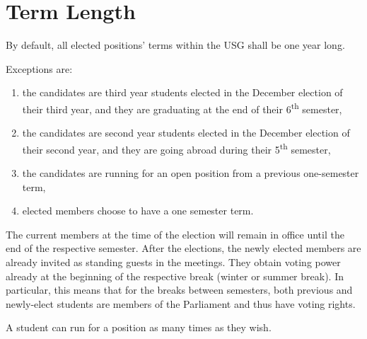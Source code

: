 \section{Term Length}
By default, all elected positions' terms within the USG shall be one year long.
\begin{parenum}
	\item Exceptions are:
	\begin{enumerate}
		\item 
		the candidates are third year students elected in the December election of their third year, and they are graduating at the end of their 6\textsuperscript{th} semester,
		\item 
		the candidates are second year students elected in the December election of their second year, and they are going abroad during their 5\textsuperscript{th} semester,
		\item
		the candidates are running for an open position from a previous one-semester term,
		
		\item elected members choose to have a one semester term.
	\end{enumerate}
	\item The current members at the time of the election will remain in office until the end of the respective semester. After the elections, the newly elected members are already invited as standing guests in the meetings. They obtain voting power already at the beginning of the respective break (winter or summer break). In particular, this means that for the breaks between semesters, both previous and newly-elect students are members of the Parliament and thus have voting rights.
	\item A student can run for a position as many times as they wish.
	
\end{parenum}
